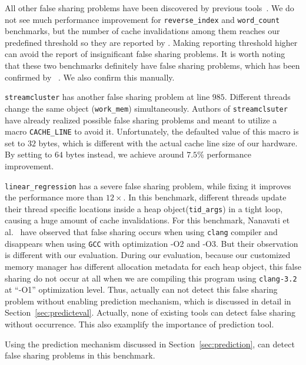 All other false sharing problems have been discovered by previous tools~\cite{sheriff}.
We do not see much performance improvement for \texttt{reverse\_index} and 
\texttt{word\_count} benchmarks, but the number of cache invalidations 
among them reaches our predefined threshold so they are reported by \predator{}.
Making reporting threshold higher can avoid the report of insignificant false sharing problems.
It is worth noting that these two benchmarks definitely have false sharing problems,
which has been confirmed by \Sheriff~\cite{sheriff}. 
We also confirm this manually. 

\texttt{streamcluster} has another false sharing problem at line $985$. 
Different threads change the same object (\texttt{work\_mem}) simultaneously. 
Authors of \texttt{streamclsuter} have already realized possible
false sharing problems and meant to utilize a macro \texttt{CACHE\_LINE} to avoid it. Unfortunately,
the defaulted value of this macro is set to $32$ bytes, which is different with the actual
cache line size of our hardware. By setting to $64$ bytes instead, we achieve around $7.5\%$ performance
improvement.

\texttt{linear\_regression} has a severe false sharing problem, 
while fixing it improves the performance more than $12\times$.
In this benchmark, different threads update their thread specific locations 
inside a heap object(\texttt{tid\_args}) in a tight loop, 
causing a huge amount of cache invalidations. 
For this benchmark, Nanavati et al.~\cite{OSdetection} have observed that 
false sharing occurs when using \texttt{clang} compiler and 
disappears when using \texttt{GCC} with optimization -O2 and -O3.  
But their observation is different with our evaluation. 
During our evaluation, because our customized memory manager has different allocation 
metadata for each heap object, this false sharing do not 
occur at all when we are compiling this program
using \texttt{clang-3.2} at ``-O1'' optimization level.
Thus, \Predator{} actually can not detect this false sharing problem without enabling 
prediction mechanism, which is discussed in detail in Section~\ref{sec:predicteval}.
Actually, none of existing tools can detect false sharing without occurrence.
This also examplify the importance of prediction tool.

Using the prediction mechanism discussed in Section~\ref{sec:prediction},
\Predator{} can detect false sharing problems in this benchmark.


